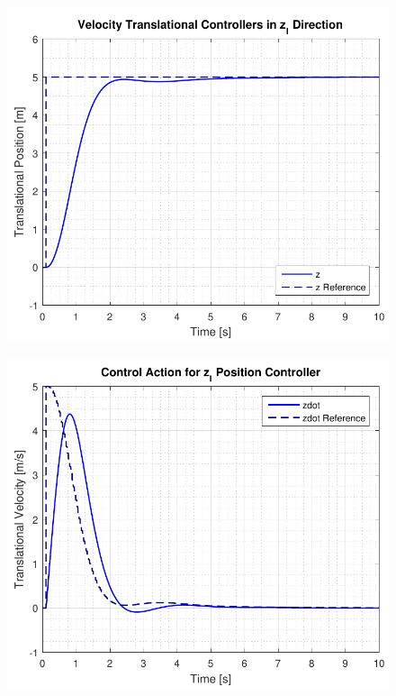 \begin{minipage}{\linewidth}
\begin{minipage}{0.5\linewidth}
\begin{figure}[H]
            \centering
            \label{fig:velocityControllerZAction}
        \end{figure}
    \end{minipage}
\end{minipage}


\begin{minipage}{\linewidth}
    \begin{minipage}{0.5\linewidth}
        \begin{figure}[H]
            \includegraphics[scale=.55]{figures/positionControllerZ}
            \centering			
            \label{fig:positionControllersZ}
        \end{figure}
    \end{minipage}
    \hspace{0.03\linewidth}
    \begin{minipage}{0.5\linewidth}
        \begin{figure}[H]
            \includegraphics[scale=.55]{figures/positionControllerZAction}

\end{figure}
\end{minipage}
\end{minipage}
